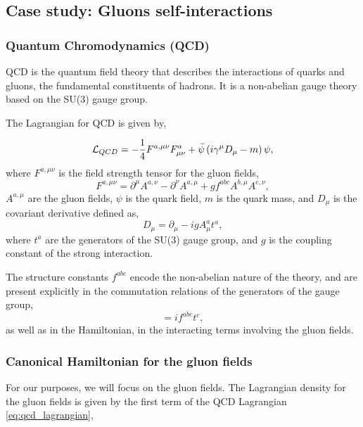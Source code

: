 \documentclass[11pt,a4paper,twoside,pdf]{article}
\numberwithin{equation}{section}
\begin{document}
\newpage


\subsection{Case study: Gluons self-interactions} \label{sec:cases}

\subsubsection{Quantum Chromodynamics (QCD)}
QCD is the quantum field theory that describes the
interactions of quarks and gluons, the fundamental constituents of hadrons.
It is a non-abelian gauge theory based on the SU(3) gauge group\cite{Illana:2022zK}.

The Lagrangian for QCD is given by,

\begin{equation}
    \mathcal{L}_{QCD} = -\frac{1}{4} F^{a,\mu\nu} F^a_{\mu\nu} + \bar{\psi}
    \left( i\gamma^\mu D_\mu - m \right) \psi,
\label{eq:qcd_lagrangian}
\end{equation}
where \( F^{a,\mu\nu} \) is the field strength tensor for the gluon fields,
\begin{equation}
    F^{a,\mu\nu} = \partial^\mu A^{a,\nu} - \partial^\nu A^{a,\mu} + g f^{abc} A^{b,\mu} A^{c,\nu},
\end{equation}
\( A^{a,\mu} \) are the gluon fields, \( \psi \) is the quark field, \( m \) is the quark mass,
and \( D_\mu \) is the covariant derivative defined as,
\begin{equation}
    D_\mu = \partial_\mu - ig A^a_\mu t^a,
\end{equation}
where \( t^a \) are the generators of the SU(3) gauge group, and \( g \) is the
coupling constant of the strong interaction.

The structure constants \( f^{abc} \) encode the non-abelian nature of the
theory, and are present explicitly in the commutation relations of the
generators of the gauge group,
\begin{equation}
    [t^a, t^b] = i f^{abc} t^c,
\end{equation}
as well as in the Hamiltonian, in the interacting terms involving the gluon fields.

\subsubsection{Canonical Hamiltonian for the gluon fields}

For our purposes, we will focus on the gluon fields. The Lagrangian density for 
the gluon fields is given by the first term of the QCD Lagrangian \eqref{eq:qcd_lagrangian},
\end{document}
